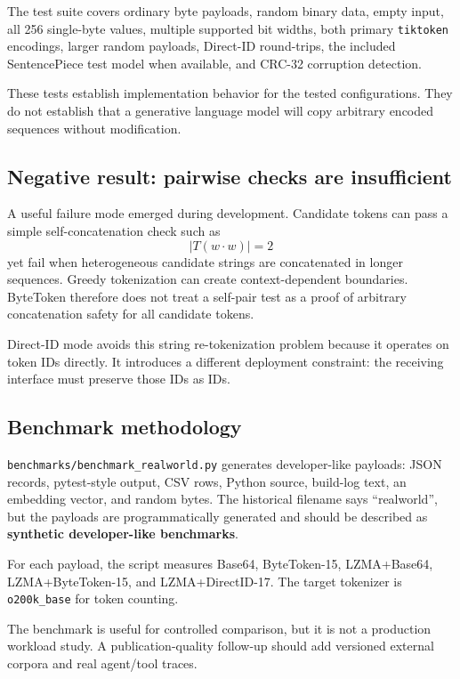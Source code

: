 \documentclass[11pt,a4paper]{article}
\begin{document}
The test suite covers ordinary byte payloads, random binary data, empty input, all 256 single-byte values, multiple supported bit widths, both primary \texttt{tiktoken} encodings, larger random payloads, Direct-ID round-trips, the included SentencePiece test model when available, and CRC-32 corruption detection.

These tests establish implementation behavior for the tested configurations. They do not establish that a generative language model will copy arbitrary encoded sequences without modification.

\subsection{Negative result: pairwise checks are insufficient}

A useful failure mode emerged during development. Candidate tokens can pass a simple self-concatenation check such as
\[
|T(w \cdot w)| = 2
\]
yet fail when heterogeneous candidate strings are concatenated in longer sequences. Greedy tokenization can create context-dependent boundaries. ByteToken therefore does not treat a self-pair test as a proof of arbitrary concatenation safety for all candidate tokens.

Direct-ID mode avoids this string re-tokenization problem because it operates on token IDs directly. It introduces a different deployment constraint: the receiving interface must preserve those IDs as IDs.

\subsection{Benchmark methodology}

\texttt{benchmarks/benchmark\_realworld.py} generates developer-like payloads: JSON records, pytest-style output, CSV rows, Python source, build-log text, an embedding vector, and random bytes. The historical filename says ``realworld'', but the payloads are programmatically generated and should be described as \textbf{synthetic developer-like benchmarks}.

For each payload, the script measures Base64, ByteToken-15, LZMA+Base64, LZMA+ByteToken-15, and LZMA+DirectID-17. The target tokenizer is \texttt{o200k\_base} for token counting.

The benchmark is useful for controlled comparison, but it is not a production workload study. A publication-quality follow-up should add versioned external corpora and real agent/tool traces.
\end{document}
